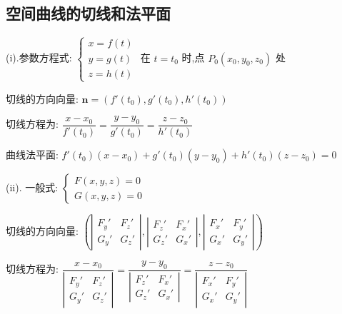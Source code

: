 \subsection{空间曲线的切线和法平面}
\begin{definition}[曲线切线和法平面]
	
	(i).参数方程式: $\left\lbrace\begin{array}{l}
		x=f(t)\\y=g(t)\\z=h(t)
	\end{array} \right. $ 在 $t=t_{0}$ 时,点 $P_{0}(x_{0},y_{0},z_{0})$ 处
	
	切线的方向向量: $\textbf{n}=(f'(t_{0}),g'(t_{0}),h'(t_{0}))$
	
	切线方程为: $ \dfrac{x-x_{0}}{f'(t_{0})}=\dfrac{y-y_{0}}{g'(t_{0})}=\dfrac{z-z_{0}}{h'(t_{0})}$
	
	曲线法平面: $f'(t_{0})(x-x_{0})+g'(t_{0})(y-y_{0})+h'(t_{0})(z-z_{0})=0 $
	
	(ii). 一般式: $\left\lbrace\begin{array}{l}
		F(x,y,z)=0\\G(x,y,z)=0
	\end{array} \right. $
	
	切线的方向向量: $(\left| \begin{array}{ll}
		F_{y}'&F_{z}'\\G_{y}'&G_{z}'
	\end{array}\right| ,\left|\begin{array}{ll}
		F_{z}'&F_{x}'\\G_{z}'&G_{x}'
	\end{array} \right|,\left|\begin{array}{ll}
		F_{x}'&F_{y}'\\G_{x}'&G_{y}'
	\end{array} \right|)$
	
	切线方程为: $\dfrac{x-x_{0}}{\left| \begin{array}{ll}
			F_{y}'&F_{z}'\\G_{y}'&G_{z}'
		\end{array}\right|}=\dfrac{y-y_{0}}{\left|\begin{array}{ll}
			F_{z}'&F_{x}'\\G_{z}'&G_{x}'
		\end{array} \right|}=\dfrac{z-z_{0}}{\left|\begin{array}{ll}
			F_{x}'&F_{y}'\\G_{x}'&G_{y}'
		\end{array} \right|}$
	

\end{definition}
